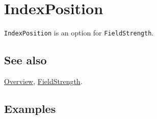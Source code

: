 \documentclass[../FeynCalcManual.tex]{subfiles}
\begin{document}
\hypertarget{indexposition}{
\section{IndexPosition}\label{indexposition}}

\texttt{IndexPosition} is an option for \texttt{FieldStrength}.

\subsection{See also}

\hyperlink{toc}{Overview}, \hyperlink{fieldstrength}{FieldStrength}.

\subsection{Examples}
\end{document}
